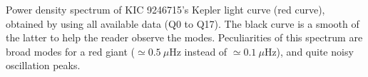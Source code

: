 \label{fig:seismo} Power density spectrum of KIC 9246715's Kepler light curve (red curve), obtained by using all available data (Q0 to Q17). The black curve is a smooth of the latter to help the reader observe the modes. Peculiarities of this spectrum are broad modes for a red giant ($\simeq0.5\ \mu$Hz instead of $\simeq0.1\ \mu$Hz), and quite noisy oscillation peaks. 
  
  